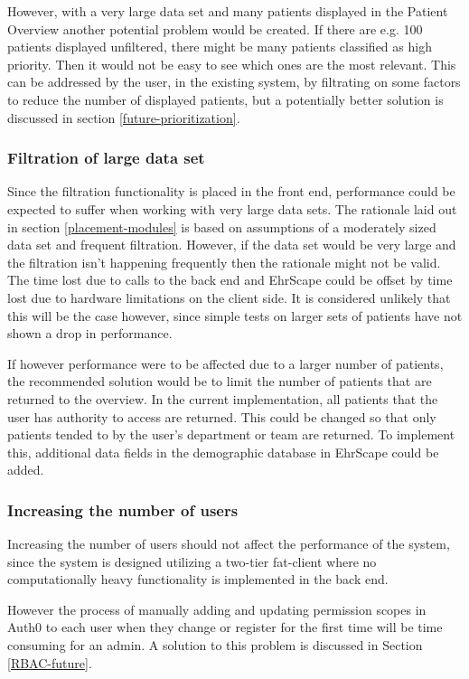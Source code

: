 \documentclass{article}
\begin{document}
However, with a very large data set and many patients displayed in the Patient Overview another potential problem would be created. If there are e.g. 100 patients displayed unfiltered, there might be many patients classified as high priority. Then it would not be easy to see which ones are the most relevant. This can be addressed by the user, in the existing system, by filtrating on some factors to reduce the number of displayed patients, but a potentially better solution is discussed in section \ref{future-prioritization}.

\subsubsection{Filtration of large data set}
Since the filtration functionality is placed in the front end, performance could be expected to suffer when working with very large data sets. The rationale laid out in section \ref{placement-modules} is based on assumptions of a moderately sized data set and frequent filtration. However, if the data set would be very large and the filtration isn't happening frequently then the rationale might not be valid. The time lost due to calls to the back end and EhrScape could be offset by time lost due to hardware limitations on the client side. It is considered unlikely that this will be the case however, since simple tests on larger sets of patients have not shown a drop in performance.

If however performance were to be affected due to a larger number of patients, the recommended solution would be to limit the number of patients that are returned to the overview. In the current implementation, all patients that the user has authority to access are returned. This could be changed so that only patients tended  to by the user's department or team are returned. To implement this, additional data fields in the demographic database in EhrScape could be added.

\subsubsection{Increasing the number of users}
Increasing the number of users should not affect the performance of the system, since the system is designed utilizing a two-tier fat-client where no computationally heavy functionality is implemented in the back end. 

However the process of manually adding and updating permission scopes in Auth0 to each user when they change or register for the first time will be time consuming for an admin. A solution to this problem is discussed in Section \ref{RBAC-future}.
\end{document}
